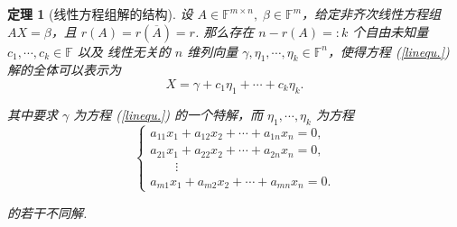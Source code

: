 \documentclass[10pt,openany]{article}
\theoremstyle{thmstyle} %
\newtheorem{theorem}{定理}[subsection]
\theoremstyle{defstyle} %
\theoremstyle{prostyle} %
\theoremstyle{exastyle}
\theoremstyle{remstyle}
\newcommand{\F}{\mathbb{F}}
\newcommand{\mn}{^{m \times n}}
\begin{document}
\begin{theorem}[线性方程组解的结构]	\label{4.3.2}
	设 \( A \in \F\mn, \; \beta \in \F^m \)，给定非齐次线性方程组 \( AX=\beta \)，且 \( r(A)=r(\overline{A})=r \). 那么存在 \( n-r(A)=:k \) 个自由未知量 \( c_1,\cdots,c_{k} \in \F \) 以及{\color{blue} 线性无关的} \( n \) 维列向量 \( \gamma,\eta_1,\cdots,\eta_k \in \F^n \)，使得方程 (\ref{linequ.}) 解的全体可以表示为
	\[ X=\gamma+c_1\eta_1+\cdots+c_k\eta_k. \] 
	
	其中要求 \( \gamma \) 为方程 (\ref{linequ.}) 的一个特解，而 \( \eta_1,\cdots,\eta_k \) 为方程
	\begin{equation}
		\left\{\begin{array}{l}
			a_{11}x_1+a_{12}x_2+\cdots+a_{1n}x_n=0, \\
			a_{21}x_1+a_{22}x_2+\cdots+a_{2n}x_n=0, \\
			\qquad \vdots \\
			a_{m1}x_1+a_{m2}x_2+\cdots+a_{mn}x_n=0.
		\end{array}\right.
		\label{linequ.2}
	\end{equation}
	
	的若干不同解.
\end{theorem}
\end{document}
